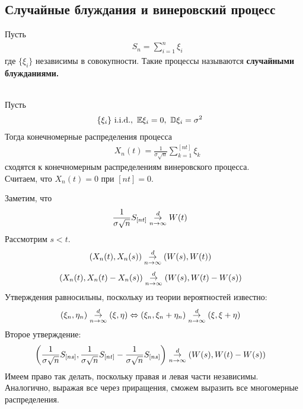 \subsection{Случайные блуждания и винеровский процесс}
\begin{Def}
    Пусть
    \begin{align*}
      & S_n = \sum_{i=1}^n \xi_i
    \end{align*}
    где $\{\xi_i\}$ независимы в совокупности. Такие процессы называются
    \textbf{случайными блужданиями.}
\end{Def}
\begin{theorem} ~
    \\
    Пусть
    \begin{align*}
      & \{\xi_i\} \ \text{i}.\text{i}.\text{d}., \ \mathbb{E} \xi_i = 0, \ \mathbb{D} \xi_i = \sigma^2
    \end{align*}
    Тогда конечномерные распределения процесса
    \begin{align*}
      & X_n (t) = \frac{1}{\sigma \sqrt{n}} \sum_{k=1}^{\left[ nt \right]} \xi_k
    \end{align*}
    сходятся к конечномерным распределениям винеровского процесса.
    \\
    Считаем, что $X_n(t) = 0$ при $[nt]=0$.
\end{theorem}
\begin{Proof}
    Заметим, что
    \begin{align*}
      & \frac{1}{\sigma \sqrt{n}}S_{[nt]} \underset{n \to \infty}{\overset{d}{\to}} W(t)
    \end{align*}
    Рассмотрим $s<t$.
    \begin{align*}
      & \left( X_n(t), X_n(s) \right) \underset{n \to \infty}{\overset{d}{\to}} (W(s), W(t))
    \end{align*}
    \begin{align*}
      & \left( X_n(t), X_n(t) - X_n(s) \right) \underset{n \to \infty}{\overset{d}{\to}} (W(s), W(t)-W(s))
    \end{align*}
    Утверждения равносильны, поскольку из теории вероятностей известно:
    \begin{align*}
      & \left( \xi_n, \eta_n \right) \underset{n \to \infty}{\overset{d}{\to}} (\xi, \eta) \Leftrightarrow \left( \xi_n, \xi_n + \eta_n \right) \underset{n \to \infty}{\overset{d}{\to}} (\xi, \xi+\eta)
    \end{align*}
    Второе утверждение:
    \begin{align*}
      & \left( \frac{1}{\sigma \sqrt{n}}S_{[ns]}, \frac{1}{\sigma \sqrt{n}}S_{[nt]} - \frac{1}{\sigma \sqrt{n}}S_{[ns]} \right) \underset{n \to \infty}{\overset{d}{\to}} \left( W(s), W(t)-W(s) \right)
    \end{align*}
    Имеем право так делать, поскольку правая и левая части независимы.
    \\
    Аналогично, выражая все через приращения, сможем выразить все многомерные распределения.
\end{Proof}